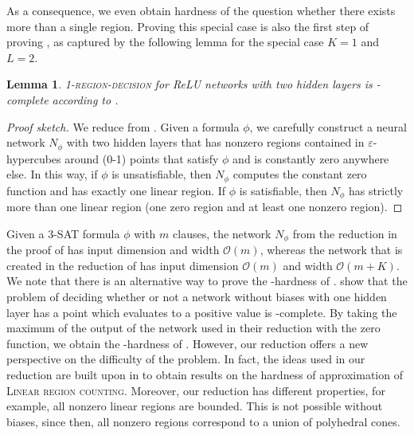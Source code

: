 \documentclass{article}
\newtheorem{lemma}[theorem]{Lemma}
\begin{document}
As a consequence, we even obtain hardness of the question whether there exists more than a single region. Proving this special case is also the first step of proving , as captured by the following lemma for the special case $K=1$ and $L=2$.
\begin{lemma}\label{thm:np_completeness_2region_decision_problem}
\textsc{1-region-decision} for ReLU networks with two hidden layers is \NP-complete according to .
\end{lemma}
\begin{proof}[Proof sketch]
We reduce from \SAT. Given a \SAT{} formula $\phi$, we carefully construct a neural network $N_\phi$ with two hidden layers that has nonzero regions contained in $\varepsilon$-hypercubes around (0-1) points that satisfy $\phi$ and is constantly zero anywhere else. In this way, if $\phi$ is unsatisfiable, then $N_\phi$ computes the constant zero function and has exactly one linear region. If $\phi$ is satisfiable, then $N_\phi$ has strictly more than one linear region (one zero region and at least one nonzero region).
\end{proof}

Given a 3-SAT formula $\phi$ with $m$ clauses, the network $N_\phi$ from the reduction in the proof of  has input dimension and width $\mathcal{O}(m)$, whereas the network that is created in the reduction of  has input dimension $\mathcal{O}(m)$ and width $\mathcal{O}(m+K)$.
We note that there is an alternative way to prove the \NP-hardness of .
\citet[Theorem 18]{froese2024complexity} show that the problem of deciding whether or not a network without biases with one hidden layer has a point which evaluates to a positive value is \NP-complete.
By taking the maximum of the output of the network used in their reduction with the zero function, we obtain the \NP-hardness of .
However, our reduction offers a new perspective on the difficulty of the problem. In fact, the ideas used in our reduction are built upon in  to obtain results on the hardness of approximation of \textsc{Linear region counting}.
Moreover, our reduction has different properties, for example, all nonzero linear regions are bounded. This is not possible without biases, since then, all nonzero regions correspond to a union of polyhedral cones.
\end{document}
